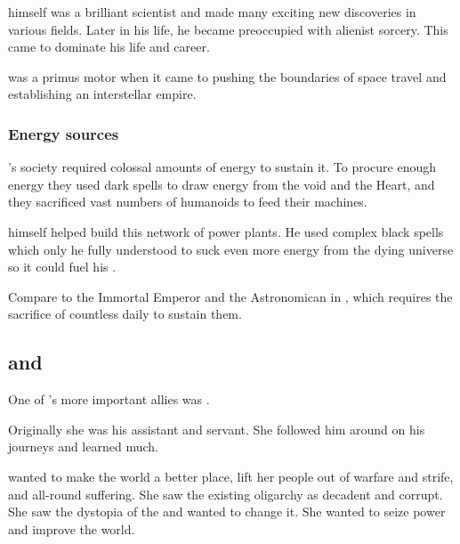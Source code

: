 \Sethicus himself was a brilliant scientist and made many exciting new discoveries in various fields. 
Later in his life, he became preoccupied with alienist sorcery.
This came to dominate his life and career. 

\Sethicus was a primus motor when it came to pushing the boundaries of space travel and establishing an interstellar \ophidian empire. 





\subsubsection{Energy sources}
\Sethicus's society required colossal amounts of energy to sustain it.
To procure enough energy they used dark spells to draw energy from the void and the Heart, and they sacrificed vast numbers of humanoids to feed their machines. 

\Sethicus himself helped build this network of power plants.
He used complex black spells which only he fully understood to suck even more energy from the dying universe so it could fuel his . 

Compare to the Immortal Emperor and the Astronomican in \cite{RPG:Warhammer40000}, which requires the sacrifice of countless \humans daily to sustain them.









\subsection[Sethicus and Tyrasshana]{\Sethicus and \Tiamat}
One of \Sethicus's more important allies was . 

Originally she was his assistant and servant.
She followed him around on his journeys and learned much. 

\Tiamat wanted to make the world a better place, lift her people out of warfare and strife,  and all-round suffering.
She saw the existing \ophidian oligarchy as decadent and corrupt. 
She saw the dystopia of the  and wanted to change it.
She wanted to seize power and improve the world. 










